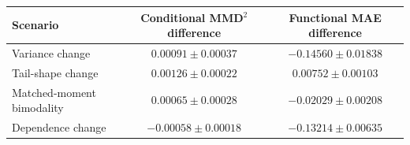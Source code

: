 \begin{tabular}{@{}lcc@{}}
\toprule
Scenario & Conditional MMD$^2$ difference & Functional MAE difference \\
\midrule
Variance change & $0.00091\pm 0.00037$ & $-0.14560\pm 0.01838$ \\
Tail-shape change & $0.00126\pm 0.00022$ & $0.00752\pm 0.00103$ \\
Matched-moment bimodality & $0.00065\pm 0.00028$ & $-0.02029\pm 0.00208$ \\
Dependence change & $-0.00058\pm 0.00018$ & $-0.13214\pm 0.00635$ \\
\bottomrule
\end{tabular}
